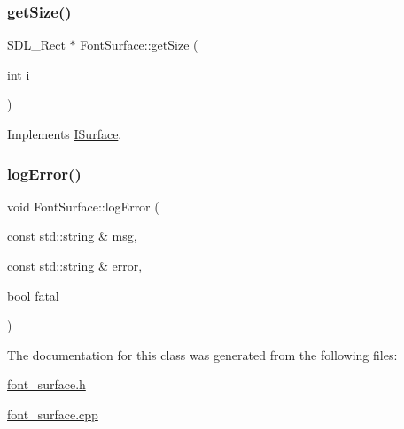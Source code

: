 \mbox{\label{class_font_surface_a42f135c62ef42a0dfddbdf6d8351ef61}} 
\subsubsection{\texorpdfstring{get\+Size()}{getSize()}}
{\footnotesize\ttfamily S\+D\+L\+\_\+\+Rect $\ast$ Font\+Surface\+::get\+Size (\begin{DoxyParamCaption}\item[{int}]{i }\end{DoxyParamCaption})\hspace{0.3cm}{\ttfamily [virtual]}}



Implements \mbox{\hyperlink{class_i_surface_ae0b5040cd0eaa1897f61f994f7b2eacf}{I\+Surface}}.

\mbox{\label{class_font_surface_a65cff9ff5d923f472b868b8ccf976fba}} 
\subsubsection{\texorpdfstring{log\+Error()}{logError()}}
{\footnotesize\ttfamily void Font\+Surface\+::log\+Error (\begin{DoxyParamCaption}\item[{const std\+::string \&}]{msg,  }\item[{const std\+::string \&}]{error,  }\item[{bool}]{fatal }\end{DoxyParamCaption})\hspace{0.3cm}{\ttfamily [virtual]}}



The documentation for this class was generated from the following files\+:\begin{DoxyCompactItemize}
\item 
\mbox{\hyperlink{font__surface_8h}{font\+\_\+surface.\+h}}\item 
\mbox{\hyperlink{font__surface_8cpp}{font\+\_\+surface.\+cpp}}\end{DoxyCompactItemize}
